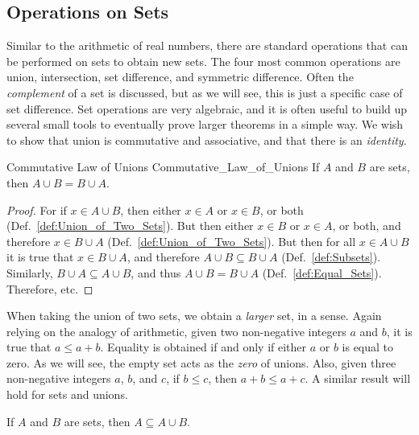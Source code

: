     \subsection{Operations on Sets}
        Similar to the arithmetic of real numbers, there
        are standard operations that can be performed on
        sets to obtain new sets. The four most common
        operations are union, intersection, set difference,
        and symmetric difference. Often the
        \textit{complement} of a set is discussed, but as
        we will see, this is just a specific case of set
        difference.
        Set operations are very algebraic, and it is often
        useful to build up several small tools to eventually
        prove larger theorems in a simple way. We wish to
        show that union is commutative and associative, and
        that there is an \textit{identity}.
        \begin{ltheorem}{Commutative Law of Unions}
              {Commutative_Law_of_Unions}
            If $A$ and $B$ are sets, then
            $A\cup{B}=B\cup{A}$.
        \end{ltheorem}
        \begin{proof}
            For if $x\in{A}\cup{B}$, then either $x\in{A}$
            or $x\in{B}$, or both
            (Def.~\ref{def:Union_of_Two_Sets}). But then either
            $x\in{B}$ or $x\in{A}$, or both, and therefore
            $x\in{B}\cup{A}$ (Def.~\ref{def:Union_of_Two_Sets}).
            But then for all $x\in{A}\cup{B}$ it is true that
            $x\in{B}\cup{A}$, and therefore
            $A\cup{B}\subseteq{B}\cup{A}$
            (Def.~\ref{def:Subsets}). Similarly,
            $B\cup{A}\subseteq{A}\cup{B}$, and thus
            $A\cup{B}=B\cup{A}$ (Def.~\ref{def:Equal_Sets}).
            Therefore, etc.
        \end{proof}
        When taking the union of two sets, we obtain a
        \textit{larger} set, in a sense. Again relying on
        the analogy of arithmetic, given two non-negative
        integers $a$ and $b$, it is true that $a\leq{a}+b$.
        Equality is obtained if and only if either $a$ or
        $b$ is equal to zero. As we will see, the empty set
        acts as the \textit{zero} of unions. Also, given
        three non-negative integers $a$, $b$, and $c$, if
        $b\leq{c}$, then $a+b\leq{a}+c$. A similar result
        will hold for sets and unions.
        \begin{theorem}
            \label{thm:Union_is_Bigger}%
            If $A$ and $B$ are sets, then
            $A\subseteq{A}\cup{B}$.
        \end{theorem}
